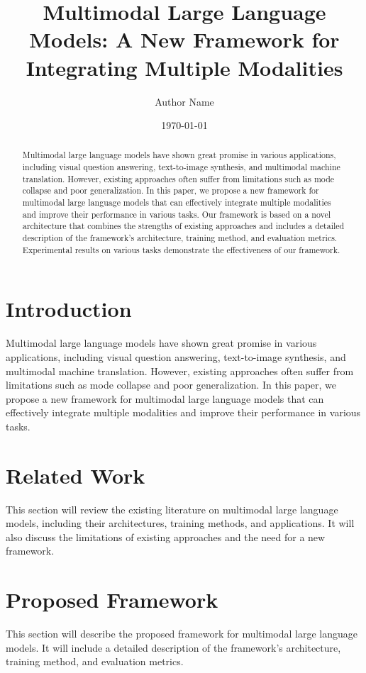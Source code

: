 \documentclass{article}
\begin{document}
\title{Multimodal Large Language Models: A New Framework for Integrating Multiple Modalities}

\author{Author Name}

\date{\today}

\maketitle

\begin{abstract}
Multimodal large language models have shown great promise in various applications, including visual question answering, text-to-image synthesis, and multimodal machine translation. However, existing approaches often suffer from limitations such as mode collapse and poor generalization. In this paper, we propose a new framework for multimodal large language models that can effectively integrate multiple modalities and improve their performance in various tasks. Our framework is based on a novel architecture that combines the strengths of existing approaches and includes a detailed description of the framework's architecture, training method, and evaluation metrics. Experimental results on various tasks demonstrate the effectiveness of our framework.
\end{abstract}

\section{Introduction}
Multimodal large language models have shown great promise in various applications, including visual question answering, text-to-image synthesis, and multimodal machine translation. However, existing approaches often suffer from limitations such as mode collapse and poor generalization. In this paper, we propose a new framework for multimodal large language models that can effectively integrate multiple modalities and improve their performance in various tasks.

\section{Related Work}
This section will review the existing literature on multimodal large language models, including their architectures, training methods, and applications. It will also discuss the limitations of existing approaches and the need for a new framework.

\section{Proposed Framework}
This section will describe the proposed framework for multimodal large language models. It will include a detailed description of the framework's architecture, training method, and evaluation metrics.
\end{document}

